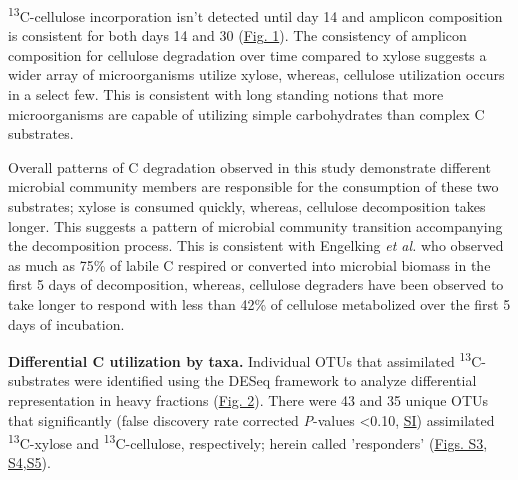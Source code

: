 \textsuperscript{13}C-cellulose incorporation isn't detected until day 14 and amplicon composition is consistent for both days 14 and 30 (\href{https://www.authorea.com/users/3537/articles/3612/master/file/figures/ordination_all1/ordination_all1.png}{Fig. 1}). The consistency of amplicon composition for cellulose degradation over time compared to xylose suggests a wider array of microorganisms utilize xylose, whereas, cellulose utilization occurs in a select few. This is consistent with long standing notions that more microorganisms are capable of utilizing simple carbohydrates than complex C substrates. 

Overall patterns of C degradation observed in this study demonstrate different microbial community members are responsible for the consumption of these two substrates; xylose is consumed quickly, whereas, cellulose decomposition takes longer. This suggests a pattern of microbial community transition accompanying the decomposition process. This is consistent with Engelking \textit{et al.}\cite{Engelking_2007} who observed as much as 75\% of labile C respired or converted into microbial biomass in the first 5 days of decomposition, whereas, cellulose degraders have been observed \cite{Hu_1997} to take longer to respond with less than 42\% of cellulose metabolized over the first 5 days of incubation. 

\textbf{Differential C utilization by taxa.} Individual OTUs that assimilated \textsuperscript{13}C-substrates were identified using the DESeq framework \cite{Anders_Huber_2010} to analyze differential representation in heavy fractions (\href{https://www.authorea.com/users/3537/articles/3612/master/file/figures/l2fc_fig1/l2fc_fig.pdf}{Fig. 2}). There were 43 and 35 unique OTUs that significantly (false discovery rate corrected \textit{P}-values \textless 0.10, \href{https://authorea.com/users/3537/articles/8459/_show_article}{SI}) assimilated \textsuperscript{13}C-xylose and \textsuperscript{13}C-cellulose, respectively; herein called 'responders' (\href{https://www.authorea.com/users/3537/articles/8459/master/file/figures/OTU_screening_schematic/OTU_screening_schematic.pdf}{Figs. S3}, \href{https://www.authorea.com/users/3537/articles/8459/master/file/figures/l2fc_fig_pVal/l2fc_fig_pVal.png}{S4},\href{https://authorea.com/users/3537/articles/8459/master/file/figures/manhattan/manhattan.png}{S5}).

